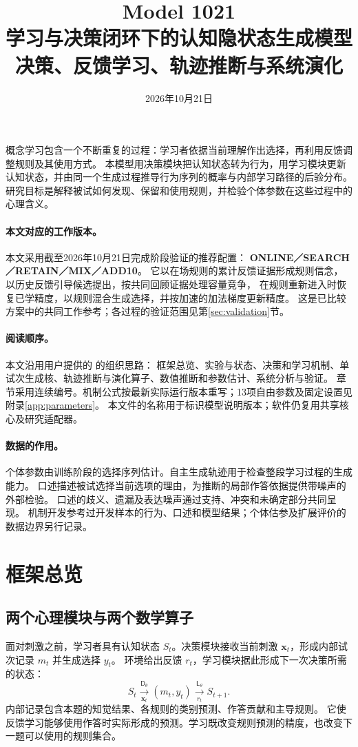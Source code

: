 \documentclass[11pt,a4paper]{article}
\title{Model 1021\\[0.5em]
\Large 学习与决策闭环下的认知隐状态生成模型\\[0.5em]
\large 决策、反馈学习、轨迹推断与系统演化}
\author{}
\date{2026年10月21日}
\numberwithin{equation}{section}
\newcommand{\Dd}{\mathsf{D}}
\newcommand{\Ll}{\mathsf{L}}
\begin{document}
\maketitle
\thispagestyle{empty}

概念学习包含一个不断重复的过程：学习者依据当前理解作出选择，再利用反馈调整规则及其使用方式。
本模型用决策模块把认知状态转为行为，用学习模块更新认知状态，并由同一个生成过程推导行为序列的概率与内部学习路径的后验分布。
研究目标是解释被试如何发现、保留和使用规则，并检验个体参数在这些过程中的心理含义。

\paragraph{本文对应的工作版本。}
本文采用截至2026年10月21日完成阶段验证的推荐配置：
\textbf{ONLINE／SEARCH／RETAIN／MIX／ADD10}。
它以在场规则的累计反馈证据形成规则信念，以历史反馈引导候选提出，按共同回顾证据处理容量竞争，
在规则重新进入时恢复已学精度，以规则混合生成选择，并按加速的加法梯度更新精度。
这是已比较方案中的共同工作参考；各过程的验证范围见第\ref{sec:validation}节。

\paragraph{阅读顺序。}
本文沿用用户提供的  的组织思路：
框架总览、实验与状态、决策和学习机制、单试次生成核、轨迹推断与演化算子、数值推断和参数估计、系统分析与验证。
章节采用连续编号。机制公式按最新实际运行版本重写；13项自由参数及固定设置见附录\ref{app:parameters}。
本文件的名称用于标识模型说明版本；软件仍复用共享核心及研究适配器。

\paragraph{数据的作用。}
个体参数由训练阶段的选择序列估计。自主生成轨迹用于检查整段学习过程的生成能力。
口述描述被试选择当前选项的理由，为推断的局部作答依据提供带噪声的外部检验。
口述的歧义、遗漏及表达噪声通过支持、冲突和未确定部分共同呈现。
机制开发参考过开发样本的行为、口述和模型结果；个体估参及扩展评价的数据边界另行记录。

\clearpage
{\small\setlength{\parskip}{0pt}\tableofcontents}
\clearpage

\section{框架总览}
\label{sec:overview}

\subsection{两个心理模块与两个数学算子}
面对刺激之前，学习者具有认知状态 $S_t$。决策模块接收当前刺激 $\bm x_t$，形成内部试次记录 $m_t$ 并生成选择 $y_t$。
环境给出反馈 $r_t$，学习模块据此形成下一次决策所需的状态：
\begin{equation}
S_t \xrightarrow[\bm x_t]{\Dd_\theta}(m_t,y_t)
\xrightarrow[r_t]{\Ll_\theta} S_{t+1}.
\label{eq:cycle}
\end{equation}
内部记录包含本题的知觉结果、各规则的类别预测、作答贡献和主导规则。
它使反馈学习能够使用作答时实际形成的预测。学习既改变规则预测的精度，也改变下一题可以使用的规则集合。
\end{document}
